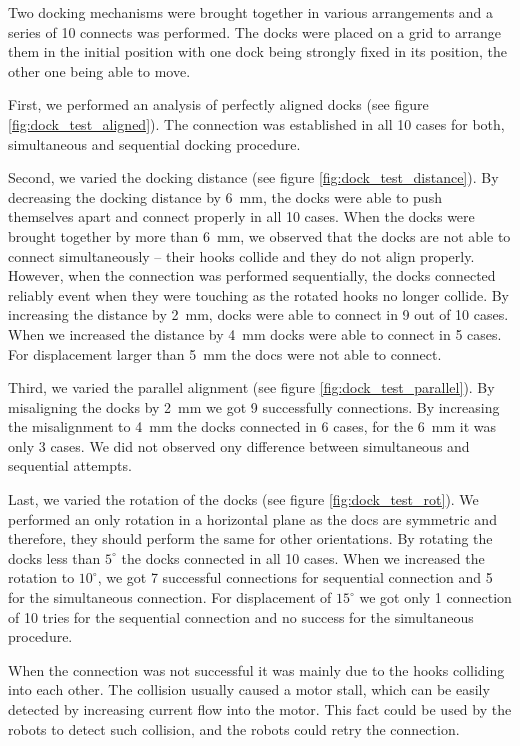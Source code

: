 Two docking mechanisms were brought together in various arrangements and a
series of 10 connects was performed. The docks were placed on a grid to arrange
them in the initial position with one dock being strongly fixed in its position,
the other one being able to move.

First, we performed an analysis of perfectly aligned docks (see figure
\ref{fig:dock_test_aligned}). The connection was established in all 10 cases for
both, simultaneous and sequential docking procedure.

Second, we varied the docking distance (see figure
\ref{fig:dock_test_distance}). By decreasing the docking distance by 6~mm, the
docks were able to push themselves apart and connect properly in all 10 cases.
When the docks were brought together by more than 6~mm, we observed that the
docks are not able to connect simultaneously -- their hooks collide and they do
not align properly. However, when the connection was performed sequentially, the
docks connected reliably event when they were touching as the rotated hooks no
longer collide. By increasing the distance by 2~mm, docks were able to connect
in 9 out of 10 cases. When we increased the distance by 4~mm docks were able to
connect in 5 cases. For displacement larger than 5~mm the docs were not able to
connect.

Third, we varied the parallel alignment (see figure
\ref{fig:dock_test_parallel}). By misaligning the docks by 2~mm we got 9
successfully connections. By increasing the misalignment to 4~mm the docks
connected in 6 cases, for the 6~mm it was only 3 cases. We did not observed ony
difference between simultaneous and sequential attempts.

Last, we varied the rotation of the docks (see figure \ref{fig:dock_test_rot}).
We performed an only rotation in a horizontal plane as the docs are symmetric
and therefore, they should perform the same for other orientations. By rotating
the docks less than $5^\circ$ the docks connected in all 10 cases. When we
increased the rotation to $10^\circ$, we got 7 successful connections for
sequential connection and 5 for the simultaneous connection. For displacement of
$15^\circ$ we got only 1 connection of 10 tries for the sequential connection
and no success for the simultaneous procedure.

When the connection was not successful it was mainly due to the hooks colliding
into each other. The collision usually caused a motor stall, which can be easily
detected by increasing current flow into the motor. This fact could be used by
the robots to detect such collision, and the robots could retry the connection.

